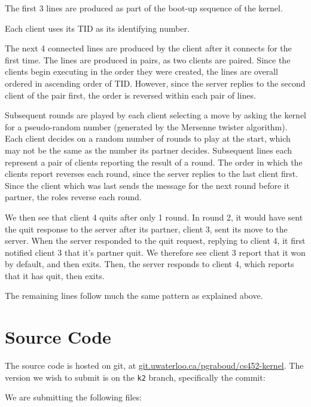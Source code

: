 \documentclass[titlepage]{article}
\begin{document}
The first 3 lines are produced as part of the boot-up sequence of the kernel.

Each client uses its TID as its identifying number.

The next 4 connected lines are produced by the client after it connects for
the first time.
The lines are produced in pairs, as two clients are paired.
Since the clients begin executing in the order they were created, the lines are
overall ordered in ascending order of TID\@.
However, since the server replies to the second client of the pair first,
the order is reversed within each pair of lines.

Subsequent rounds are played by each client selecting a move by asking the kernel
for a pseudo-random number (generated by the Mersenne twister algorithm).
Each client decides on a random number of rounds to play at the start, which may not
be the same as the number its partner decides.
Subsequent lines each represent a pair of clients reporting the result of a round.
The order in which the clients report reverses each round, since the server replies to
the last client first.
Since the client which was last sends the message for the next round before it partner,
the roles reverse each round.

We then see that client 4 quits after only 1 round.
In round 2, it would have sent the quit response to the server after its partner, client 3,
sent its move to the server.
When the server responded to the quit request, replying to client 4, it first notified client 3
that it's partner quit.
We therefore see client 3 report that it won by default, and then exits.
Then, the server responds to client 4, which reports that it has quit, then exits.

The remaining lines follow much the same pattern as explained above.

\section{Source Code}
The source code is hosted on git, at \url{git.uwaterloo.ca/pgraboud/cs452-kernel}.
The version we wish to submit is on the \texttt{k2} branch, specifically
the commit:

We are submitting the following files:


\end{document}
